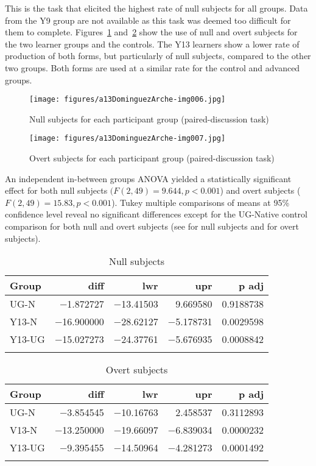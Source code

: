 \documentclass[output=paper]{langscibook}
\begin{document}
This is the task that elicited the highest rate of null subjects for all groups. Data from the Y9 group are not available as this task was deemed too difficult for them to complete. Figures~\ref{fig:dominguez:6} and~\ref{fig:dominguez:7} show the use of null and overt subjects for the two learner groups and the controls. The Y13 learners show a lower rate of production of both forms, but particularly of null subjects, compared to the other two groups. Both forms are used at a similar rate for the control and advanced groups.

\begin{figure}[p]
\caption{Null subjects for each participant group (paired-discussion task)}
\label{fig:dominguez:6}
\texttt{[image: figures/a13DominguezArche-img006.jpg]}
\end{figure}

\begin{figure}[p]
\caption{Overt subjects for each participant group (paired-discussion task)}
\label{fig:dominguez:7}
\texttt{[image: figures/a13DominguezArche-img007.jpg]}
\end{figure}

\begin{sloppypar}
An independent in-between groups ANOVA yielded a statistically significant effect for both null subjects $(F (2, 49) = 9.644,\allowbreak p  <0.001$) and overt subjects ($F (2,49) = 15.83,\allowbreak p <0.001$). Tukey multiple comparisons of means at 95\% confidence level reveal no significant differences except for the UG-Native control comparison for both null and overt subjects (see  for null subjects and  for overt subjects).
\end{sloppypar}

\vfill
\begin{table}[H]
\caption{Null subjects}
\label{tab:dominguez:10}
\begin{tabular}{lrrrr}
\lsptoprule
Group & diff & lwr & upr & p adj\\
\midrule
UG-N & −1.872727 & −13.41503 & 9.669580 & 0.9188738\\
Y13-N & −16.900000 & −28.62127 & −5.178731 & 0.0029598\\
Y13-UG & −15.027273 & −24.37761 & −5.676935 & 0.0008842\\
\lspbottomrule
\end{tabular}
\end{table}

\begin{table}[H]
\caption{Overt subjects}
\label{tab:dominguez:11}
\begin{tabular}{lrrrr}
\lsptoprule
Group & diff & lwr & upr & p adj\\
\midrule
UG-N & −3.854545 & −10.16763 & 2.458537 & 0.3112893\\
V13-N & −13.250000 & −19.66097 & −6.839034 & 0.0000232\\
Y13-UG & −9.395455 & −14.50964 & −4.281273 & 0.0001492\\
\lspbottomrule
\end{tabular}
\end{table}
\vfill\pagebreak
\end{document}
